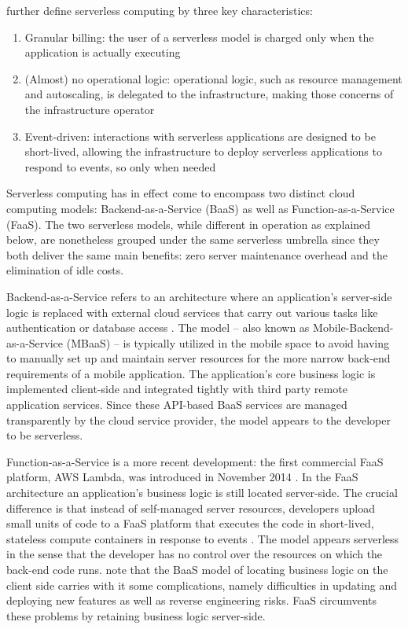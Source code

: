 \documentclass[utf8,english]{gradu3}
\begin{document}
\textcite{van2017spec} further define serverless computing by three key characteristics: \begin{enumerate}
  \item Granular billing: the user of a serverless model is charged only when the application is actually executing
  \item (Almost) no operational logic: operational logic, such as resource management and autoscaling, is delegated to the infrastructure, making those concerns of the infrastructure operator
  \item Event-driven: interactions with serverless applications are designed to be short-lived, allowing the infrastructure to deploy serverless applications to respond to events, so only when needed
\end{enumerate}

Serverless computing has in effect come to encompass two distinct cloud computing models: Backend-as-a-Service (BaaS) as well as Function-as-a-Service (FaaS). The two serverless models, while different in operation as explained below, are nonetheless grouped under the same serverless umbrella since they both deliver the same main benefits: zero server maintenance overhead and the elimination of idle costs. \parencite{cncf18serverlessWG}

Backend-as-a-Service refers to an architecture where an application's server-side logic is replaced with external cloud services that carry out various tasks like authentication or database access \parencite{buyya2017manifesto}. The model -- also known as Mobile-Backend-as-a-Service (MBaaS) \parencite{sareen13cloudTypes} -- is typically utilized in the mobile space to avoid having to manually set up and maintain server resources for the more narrow back-end requirements of a mobile application. The application's core business logic is implemented client-side and integrated tightly with third party remote application services. Since these API-based BaaS services are managed transparently by the cloud service provider, the model appears to the developer to be serverless.

Function-as-a-Service is a more recent development: the first commercial FaaS platform, AWS Lambda, was introduced in November 2014 \parencite{awslambda0218}. In the FaaS architecture an application's business logic is still located server-side. The crucial difference is that instead of self-managed server resources, developers upload small units of code to a FaaS platform that executes the code in short-lived, stateless compute containers in response to events \parencite{robert2016serverlessarchitectures}. The model appears serverless in the sense that the developer has no control over the resources on which the back-end code runs. \textcite{albuquerque17faaspaas} note that the BaaS model of locating business logic on the client side carries with it some complications, namely difficulties in updating and deploying new features as well as reverse engineering risks. FaaS circumvents these problems by retaining business logic server-side.
\end{document}

